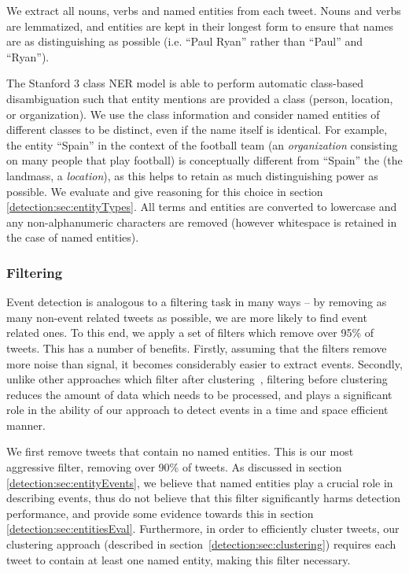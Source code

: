 We extract all nouns, verbs and named entities from each tweet.
Nouns and verbs are lemmatized, and entities are kept in their longest form to ensure that names are as distinguishing as possible  (i.e. ``Paul Ryan'' rather than ``Paul'' and ``Ryan'').

The Stanford 3 class NER model is able to perform automatic class-based disambiguation such that entity mentions are provided a class (person, location, or organization).
We use the class information and consider named entities of different classes to be distinct, even if the name itself is identical.
For example, the entity ``Spain'' in the context of the football team (an \emph{organization} consisting on many people that play football) is conceptually different from ``Spain'' the (the landmass, a \emph{location}), as this helps to retain as much distinguishing power as possible.
We evaluate and give reasoning for this choice in section \ref{detection:sec:entityTypes}.
All terms and entities are converted to lowercase and any non-alphanumeric characters are removed (however whitespace is retained in the case of named entities).

\subsubsection{Filtering}
Event detection is analogous to a filtering task in many ways -- by removing as many non-event related tweets as possible, we are more likely to find event related ones. To this end, we apply a set of filters which remove over 95\% of tweets.
This has a number of benefits.
Firstly, assuming that the filters remove more noise than signal, it becomes considerably easier to extract events.
Secondly, unlike other approaches which filter after clustering~\citep{Petrovic:2010:SFS:1857999.1858020,becker2011beyond}, filtering before clustering reduces the amount of data which needs to be processed, and plays a significant role in the ability of our approach to detect events in a time and space efficient manner.

We first remove tweets that contain no named entities.
This is our most aggressive filter, removing over 90\% of tweets.
As discussed in section \ref{detection:sec:entityEvents}, we believe that named entities play a crucial role in describing events, thus do not believe that this filter significantly harms detection performance, and provide some evidence towards this in section \ref{detection:sec:entitiesEval}.
Furthermore, in order to efficiently cluster tweets, our clustering approach (described in section~\ref{detection:sec:clustering}) requires each tweet to contain at least one named entity, making this filter necessary.

